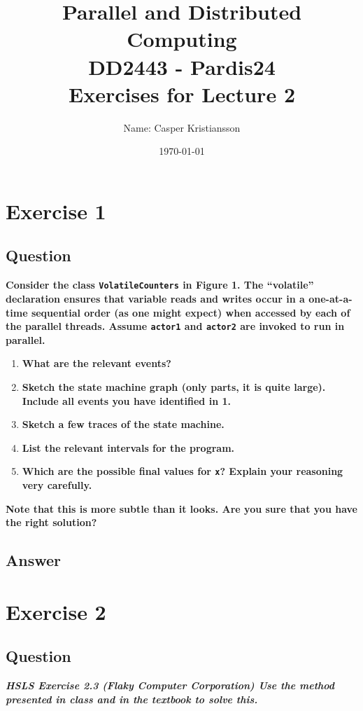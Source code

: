 \documentclass{article}
\title{\textbf{Parallel and Distributed Computing\\DD2443 - Pardis24\\Exercises for Lecture 2}}
\author{Name: Casper Kristiansson}
\date{\today}
\begin{document}
\setlength\parindent{0pt}
\setlength{\parskip}{\bigskipamount}

\maketitle

\section*{Exercise 1}
\subsection*{Question}
\textbf{Consider the class \texttt{VolatileCounters} in Figure 1. The ``volatile'' declaration ensures that variable reads and writes occur in a one-at-a-time sequential order (as one might expect) when accessed by each of the parallel threads. Assume \texttt{actor1} and \texttt{actor2} are invoked to run in parallel.}

\begin{enumerate}
    \item \textbf{What are the relevant events?}
    \item \textbf{Sketch the state machine graph (only parts, it is quite large). Include all events you have identified in 1.}
    \item \textbf{Sketch a few traces of the state machine.}
    \item \textbf{List the relevant intervals for the program.}
    \item \textbf{Which are the possible final values for \texttt{x}? Explain your reasoning very carefully.}
\end{enumerate}

\textbf{Note that this is more subtle than it looks. Are you sure that you have the right solution?}

\subsection*{Answer}



\section*{Exercise 2}
\subsection*{Question}
\textit{\textbf{HSLS Exercise 2.3 (Flaky Computer Corporation) Use the method presented in class and in the textbook to solve this.}}
\end{document}
